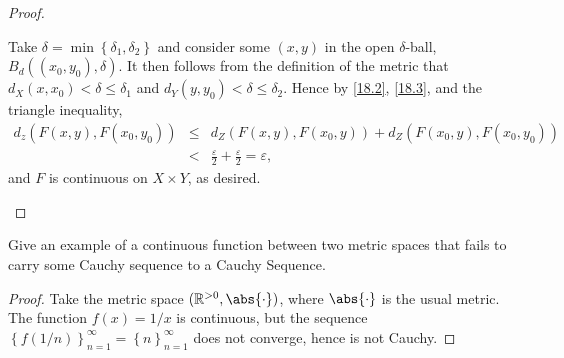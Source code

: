 \documentclass[12pt]{amsart}
\begin{document}
\begin{setup}
\begin{proof}
\begin{enumerate}[(a)]
      Take $\delta = \min \left\{\delta_1, \delta_2\right\}$ and consider some $(x,y)$ in the open $\delta$-ball, $B_d((x_0, y_0), \delta)$.
      It then follows from the definition of the metric that $d_X(x, x_0) < \delta \leq \delta_1$ and $d_Y(y,y_0) < \delta \leq \delta_2$.
      Hence by \eqref{18.2}, \eqref{18.3}, and the triangle inequality,
      \begin{eqnarray*}
        d_z\left(F\left(x,y\right), F\left(x_0,y_0\right)\right) &\leq& d_Z\left(F\left(x,y\right), F\left(x_0, y\right)\right) + d_Z\left(F\left(x_0,y\right), F\left(x_0, y_0\right)\right)\\
        &<& \frac{\varepsilon}{2} + \frac{\varepsilon}{2} = \varepsilon,
      \end{eqnarray*}
      and $F$ is continuous on $X \times Y$, as desired.
    \end{enumerate}
  \end{proof}
\end{setup}

\begin{setup}
  Give an example of a continuous function between two metric spaces that fails to carry some Cauchy sequence to a Cauchy Sequence.
  \begin{proof}
    Take the metric space $(\mathbb{R}^{>0}, \abs{\cdot})$, where $\abs{\cdot}$ is the usual metric.
    The function $f(x) = 1/x$ is continuous, but the sequence $\left\{f(1/n)\right\}_{n=1}^\infty = \left\{n\right\}_{n=1}^\infty$ does not converge, hence is not Cauchy.
  \end{proof}
\end{setup}
\end{document}
